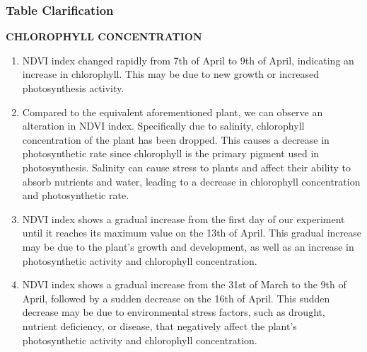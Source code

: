 \documentclass{article}
\begin{document}
                    \subsubsection{Table Clarification}
                    
                            \vspace*{3\baselineskip}
                            \textbf{CHLOROPHYLL CONCENTRATION}\par
                            \vspace*{1\baselineskip}
                            \begin{enumerate}
                                \item  NDVI index changed rapidly from 7th of April to 9th of April, indicating an increase in chlorophyll. This may be due to new growth or increased photosynthesis activity.\par
                                \vspace*{1\baselineskip}
                                
                                \item   Compared to the equivalent aforementioned plant, we can observe an alteration in NDVI index. Specifically due to salinity, chlorophyll concentration of the plant has been dropped. This causes a decrease in photosynthetic rate since chlorophyll is the primary pigment used in photosynthesis. Salinity can cause stress to plants and affect their ability to absorb nutrients and water, leading to a decrease in chlorophyll concentration and photosynthetic rate.\par
                                \vspace*{1\baselineskip}
                                
                                \item   NDVI index shows a gradual increase from the first day of our experiment until it reaches its maximum value on the 13th of April. This gradual increase may be due to the plant's growth and development, as well as an increase in photosynthetic activity and chlorophyll concentration.\par
                                \vspace*{1\baselineskip}
                                
                                \item   NDVI index shows a gradual increase from the 31st of March to the 9th of April, followed by a sudden decrease on the 16th of April. This sudden decrease may be due to environmental stress factors, such as drought, nutrient deficiency, or disease, that negatively affect the plant's photosynthetic activity and chlorophyll concentration.\par
                            \vspace*{1\baselineskip}

                            \end{enumerate}
                           
\end{document}
